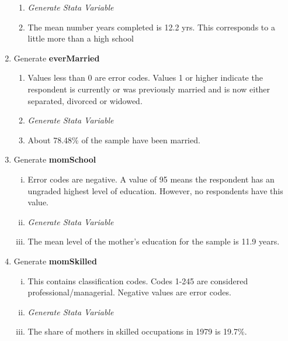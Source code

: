 \documentclass[12pt]{article}
\begin{document}
\begin{enumerate}[\indent a.]
\begin{enumerate}
        \item \textit{Generate Stata Variable}

        \item The mean number years completed is 12.2 yrs.  This corresponds to 
        a little more than a high school
    \end{enumerate}

    \item Generate \textbf{everMarried}
    \begin{enumerate}
        \item Values less than 0 are error codes. Values 1 or higher indicate 
        the respondent is currently or was previously married and is now either 
        separated, divorced or widowed.

        \item \textit{Generate Stata Variable}
        
        \item About 78.48\% of the sample have been married.
    \end{enumerate}    
    
    \item Generate \textbf{momSchool}
    \begin{enumerate}[(i)]
        \item Error codes are negative.  A value of 95 means the respondent has 
        an ungraded highest level of education.  However, no respondents have 
        this value.

        \item \textit{Generate Stata Variable}
        
        \item The mean level of the mother's education for the sample is 11.9 
        years.  
    \end{enumerate}

    \item Generate \textbf{momSkilled}
    \begin{enumerate}[(i)]
        \item This contains classification codes.  Codes 1-245 are considered 
        professional/managerial. Negative values are error codes.

        \item \textit{Generate Stata Variable}
        
        \item The share of mothers in skilled occupations in 1979 is 19.7\%.
    \end{enumerate}


\end{enumerate}
\end{document}
